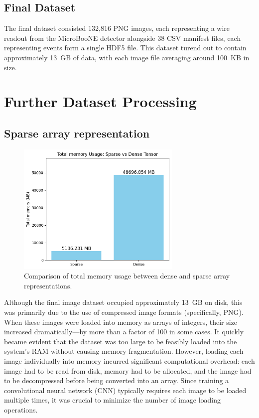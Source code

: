 \documentclass{pracalicmgr}
\begin{document}
\subsection{Final Dataset}

The final dataset consisted 132,816 PNG images, each representing a wire readout from the MicroBooNE detector alongside 38 CSV manifest files, each representing events form a single HDF5 file. This dataset turend out to contain approximately 13~GB of data, with each image file averaging around 100~KB in size.

\section{Further Dataset Processing}

\subsection{Sparse array representation}

\begin{figure}[H]
    \centering
    \includegraphics[width=0.7\textwidth]{src/totalSparseDense.png}
    \caption{Comparison of total memory usage between dense and sparse array representations.}
    \label{fig:memRedTot}
\end{figure}


Although the final image dataset occupied approximately 13~GB on disk, this was primarily due to the use of compressed image formats (specifically, PNG). When these images were loaded into memory as arrays of integers, their size increased dramatically—by more than a factor of 100 in some cases. It quickly became evident that the dataset was too large to be feasibly loaded into the system's RAM without causing memory fragmentation. However, loading each image individually into memory incurred significant computational overhead: each image had to be read from disk, memory had to be allocated, and the image had to be decompressed before being converted into an array. Since training a convolutional neural network (CNN) typically requires each image to be loaded multiple times, it was crucial to minimize the number of image loading operations.
\end{document}
